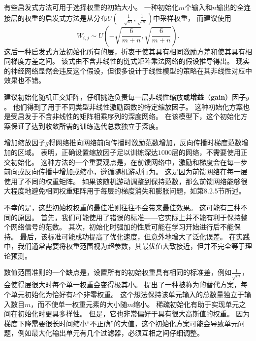 有些启发式方法可用于选择权重的初始大小。
一种初始化$m$个输入和$n$输出的全连接层的权重的启发式方法是从分布$U(-\frac{1}{\sqrt{m}}, \frac{1}{\sqrt{m}})$中采样权重，
而\cite{Glorot+al-AI-2011-small}建议使用
\begin{equation}
    W_{i,j} \sim U \left(-\sqrt{\frac{6}{m+n}}, \sqrt{\frac{6}{m+n}}\right) .
\end{equation}
这后一种启发式方法初始化所有的层，折衷于使其具有相同激励方差和使其具有相同梯度方差之间。
该式由不含非线性的链式矩阵乘法网络的假设推导得出。
现实的神经网络显然会违反这个假设，但很多设计于线性模型的策略在其非线性对应中效果也不错。


\cite{Saxe-et-al-ICLR13}建议初始化随机正交矩阵，仔细挑选负责每一层非线性缩放或\textbf{增益}（\textbf{gain}）因子$g$。
他们得到了用于不同类型非线性激励函数的特定缩放因子。
这种初始化方案也是受启发于不含非线性的矩阵相乘序列的深度网络。
在该模型下，这个初始化方案保证了达到收敛所需的训练迭代总数独立于深度。

增加缩放因子$g$将网络推向网络前向传播时激励范数增加，反向传播时梯度范数增加的区域。
\cite{Sussillo14}表明，正确设置缩放因子足以训练深达$1000$层的网络，不需要使用正交初始化。
这种方法的一个重要观点是，在前馈网络中，激励和梯度会在每一步前向或反向传播中增加或缩小，遵循随机游动行为。
这是因为前馈网络在每一层使用了不同的权重矩阵。
如果该随机游动调整到保持范数，那么前馈网络能够很大程度地避免相同权重矩阵用于每层的梯度消失和膨胀问题，如第8.2.5节所述。

不幸的是，这些初始权权重的最佳准则往往不会带来最佳效果。
这可能有三种不同的原因。
首先，我们可能使用了错误的标准——它实际上并不能有利于保持整个网络信号的范数。
其次，初始化时强加的性质可能在学习开始进行后不能保持。
最后，该标准可能成功提高了优化速度，但意外地增大了泛化误差。
在实践中，我们通常需要将权重范围视为超参数，其最优值大致接近，但并不完全等于理论预测。


数值范围准则的一个缺点是，设置所有的初始权重具有相同的标准差，例如$\frac{1}{\sqrt{m}}$，会使得层很大时每个单一权重会变得极其小。
\cite{martens2010hessian-small}提出了一种被称为的替代方案，每个单元初始化为恰好有$k$个非零权重。
这个想法保持该单元输入的总数量独立于输入数目$m$，而不使单一权重元素的大小随$m$缩小。
稀疏初始化有助于实现单元之间在初始化时更具多样性。
但是，它也非常偏好于具有很大高斯值的权重。
因为梯度下降需要很长时间缩小“不正确”的大值，这个初始化方案可能会导致单元问题，例如最大化输出单元有几个过滤器，必须互相之间仔细调整。

